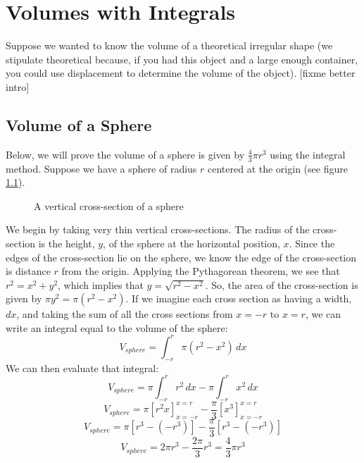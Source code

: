 \chapter{Volumes with Integrals}
Suppose we wanted to know the volume of a theoretical irregular shape (we 
stipulate theoretical because, if you had this object and a large enough 
container, you could use displacement to determine the volume of the object). 
[fixme better intro]
\section{Volume of a Sphere}
Below, we will prove the volume of a sphere is given by $\frac{4}{3}\pi r^3$ 
using the integral method. Suppose we have a sphere of radius $r$ centered at 
the origin (see figure \ref{fig:sphere}).

\begin{figure}[htbp]
\centering
    \caption{A vertical cross-section of a sphere}
    \label{fig:sphere}
\end{figure}

We begin by taking very thin vertical cross-sections. The radius of the 
cross-section is the height, $y$, of the sphere at the horizontal position, 
$x$. Since the edges of the cross-section lie on the sphere, we know the edge 
of the cross-section is distance $r$ from the origin. Applying the Pythagorean 
theorem, we see that $r^2 = x^2 + y^2$, which implies that $y = \sqrt{r^2 - x^2
}$. So, the area of the cross-section is given by $\pi y^2 = \pi (r^2 - x^
2)$. If we imagine each cross section as having a width, $dx$, and taking the 
sum of all the cross sections from $x = -r$ to $x = r$, we can write an 
integral equal to the volume of the sphere:
$$V_{sphere} = \int_{-r}^{r} \pi (r^2 - x^2)\,dx$$
We can then evaluate that integral:
$$V_{sphere} = \pi \int_{-r}^{r} r^2\,dx - \pi \int_{-r}^{r} x^2\,dx$$
$$V_{sphere} = \pi \left[ r^2 x \right] _{x = -r}^{x = r} - \frac{\pi}{3} \left[
x^3 \right] _{x = -r}^{x = r} $$
$$V_{sphere} = \pi \left[ r^3 - (-r^3) \right] - \frac{\pi}{3} \left[r^3 - (-r^
3) \right]$$
$$V_{sphere} = 2 \pi r^3 - \frac{2\pi}{3} r^3 = \frac{4}{3}\pi r^3$$

